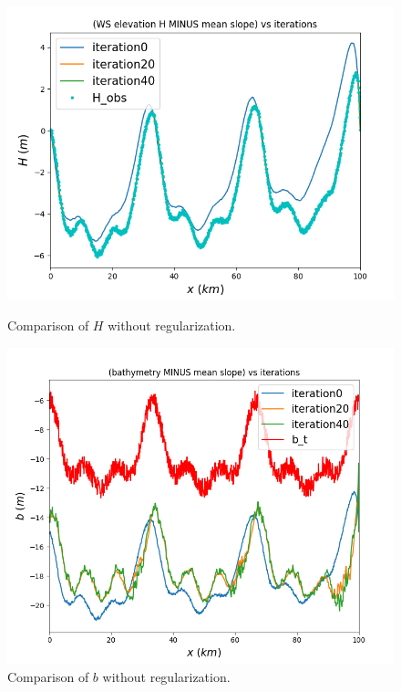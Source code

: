 \documentclass{article}
\begin{document}
\begin{figure}[H]
    \begin{minipage}[b]{0.45\linewidth}
        \centering
        \includegraphics[width=\linewidth]{Images_Ayoub/No_Regularisation/H_Comparaison.png}
        \caption{Comparison of \( H \) without regularization.}
        \label{fig:h-comparaison}
    \end{minipage}
    \hfill
    \begin{minipage}[b]{0.45\linewidth}
        \centering
        \includegraphics[width=\linewidth]{Images_Ayoub/No_Regularisation/b_Comparaison.png}
        \caption{Comparison of \( b \) without regularization.}
        \label{fig:b-comparaison}
    \end{minipage}


\end{figure}
\end{document}
